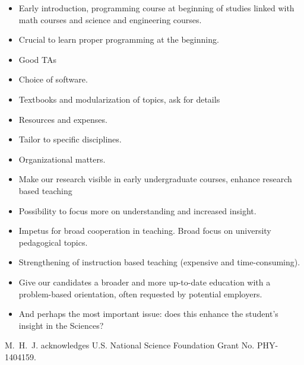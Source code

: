 \documentclass[graybox,envcountchap,sectrefs]{svmult}
\begin{document}
\begin{itemize}
\item Early introduction, programming course at beginning of studies linked with math courses and science and engineering courses.

\item Crucial to learn proper programming at the beginning.

\item Good TAs

\item Choice of software.

\item Textbooks and modularization of topics, ask for details

\item Resources and expenses.

\item Tailor to specific disciplines.

\item Organizational matters.


\item Make our research visible in early undergraduate courses, enhance research based teaching

\item Possibility to focus more on understanding and increased insight.

\item Impetus for broad cooperation in teaching. Broad focus on university pedagogical topics.

\item Strengthening of instruction based teaching (expensive and time-consuming).

\item Give our candidates a broader and more up-to-date education with a problem-based orientation, often requested by potential employers.

\item And perhaps the most important issue: does this enhance the student's insight in the Sciences?
\end{itemize}




\begin{acknowledgement}
M.~H.~J. acknowledges U.S. National Science Foundation  Grant No. PHY-1404159.
\end{acknowledgement}








\end{document}
